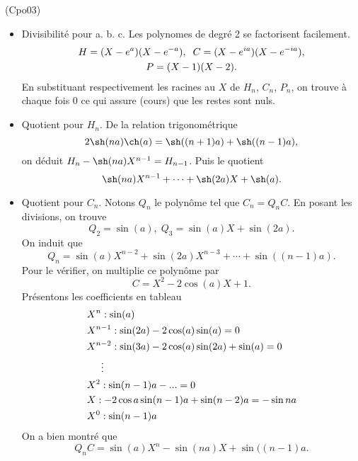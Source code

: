 \begin{tiny}(Cpo03)\end{tiny} 
\begin{itemize}
  \item Divisibilité pour a. b. c.\newline
Les polynomes de degré 2 se factorisent facilement.
\begin{multline*}
  H = (X-e^a)(X-e^{-a}), \hspace{0.2cm} C = (X-e^{ia})(X-e^{-ia}), \\
  P = (X-1)(X-2).
\end{multline*}
En substituant respectivement les racines au $X$ de $H_n$, $C_n$, $P_n$, on trouve à chaque fois $0$ ce qui assure (cours) que les restes sont nuls.

  \item Quotient pour $H_n$.\newline
De la relation trigonométrique
\[
  2\sh(na) \ch(a) = \sh((n+1)a) + \sh((n-1)a),
\]
on déduit $H_n - \sh(na)X^{n-1} = H_{n-1}$.\newline
Puis le quotient
\[
  \sh(na)X^{n-1} + \cdots + \sh(2a)X + \sh(a).
\]

  \item Quotient pour $C_n$.\newline
Notons $Q_n$ le polynôme tel que $C_n = Q_n C$. En posant les divisions, on trouve
\[
  Q_2 = \sin(a), \; Q_3 = \sin(a) X + \sin(2a).
\]
On induit que 
\[
  Q_n = \sin(a) X^{n-2} + \sin(2a)X^{n-3} + \cdots + \sin((n-1)a).
\]
Pour le vérifier, on multiplie ce polynôme par
\[
  C = X^2 - 2\cos(a) X + 1.
\]
Présentons les coefficients en tableau
\begin{align*}
  &X^n : \sin(a) \\
  &X^{n-1} : \sin(2a) - 2\cos(a)\sin(a) = 0 \\
  &X^{n-2} : \sin(3a) - 2\cos(a)\sin(2a) + \sin(a) = 0\\
  & \hspace{0.5cm} \vdots                                         \\
  &X^{2} : \sin(n-1)a -                    ...  = 0\\
  &X  : - 2\cos a\sin(n-1)a + \sin(n-2)a = -\sin na\\
  &X^0 : \sin(n-1)a  
\end{align*}
On a bien montré que
\[
  Q_n C = \sin(a)X^n - \sin(na) X + \sin((n-1)a.
\]


\end{itemize}
